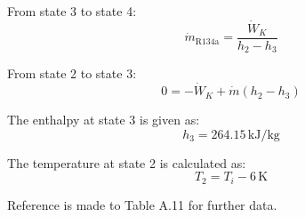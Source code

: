 From state 3 to state 4:  
\[
\dot{m}_{\text{R134a}} = \frac{\dot{W}_K}{h_2 - h_3}
\]  

From state 2 to state 3:  
\[
0 = -\dot{W}_K + \dot{m} (h_2 - h_3)
\]  

The enthalpy at state 3 is given as:  
\[
h_3 = 264.15 \, \text{kJ/kg}
\]  

The temperature at state 2 is calculated as:  
\[
T_2 = T_i - 6 \, \text{K}
\]  

Reference is made to Table A.11 for further data.